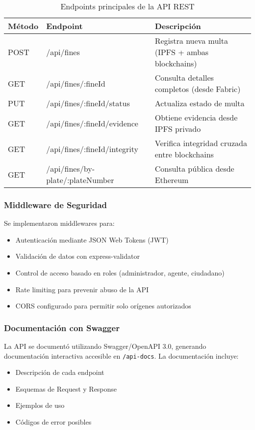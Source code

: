 \begin{table}[h]
\centering
\begin{tabular}{|l|l|p{6cm}|}
\hline
\textbf{Método} & \textbf{Endpoint} & \textbf{Descripción} \\ \hline
POST & /api/fines & Registra nueva multa (IPFS + ambas blockchains) \\ \hline
GET & /api/fines/:fineId & Consulta detalles completos (desde Fabric) \\ \hline
PUT & /api/fines/:fineId/status & Actualiza estado de multa \\ \hline
GET & /api/fines/:fineId/evidence & Obtiene evidencia desde IPFS privado \\ \hline
GET & /api/fines/:fineId/integrity & Verifica integridad cruzada entre blockchains \\ \hline
GET & /api/fines/by-plate/:plateNumber & Consulta pública desde Ethereum \\ \hline
\end{tabular}
\caption{Endpoints principales de la API REST}
\end{table}

\subsubsection{Middleware de Seguridad}

Se implementaron middlewares para:
\begin{itemize}
    \item Autenticación mediante JSON Web Tokens (JWT)
    \item Validación de datos con express-validator
    \item Control de acceso basado en roles (administrador, agente, ciudadano)
    \item Rate limiting para prevenir abuso de la API
    \item CORS configurado para permitir solo orígenes autorizados
\end{itemize}

\subsubsection{Documentación con Swagger}

La API se documentó utilizando Swagger/OpenAPI 3.0, generando documentación interactiva accesible en \texttt{/api-docs}. La documentación incluye:
\begin{itemize}
    \item Descripción de cada endpoint
    \item Esquemas de Request y Response
    \item Ejemplos de uso
    \item Códigos de error posibles
\end{itemize}

